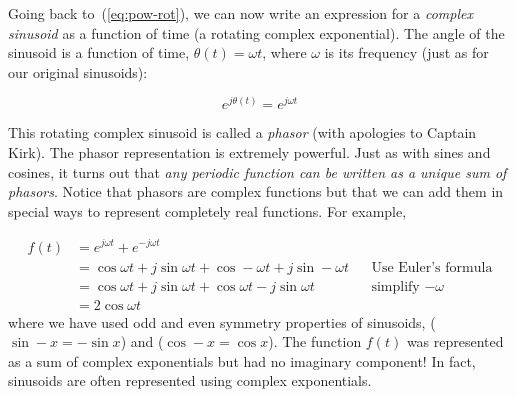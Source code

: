 
Going back to~(\ref{eq:pow-rot}), we can now write an expression for a
\emph{complex sinusoid} as a function of time (a rotating complex exponential). The angle
of the sinusoid is a function of time, $\theta(t) = \omega t$, where
$\omega$ is its frequency (just as for our original sinusoids):

\begin{equation}
e^{j\theta(t)} = e^{j\omega t} \label{eq:phasor-first}
\end{equation}

This rotating complex sinusoid is called a \emph{phasor} (with
apologies to Captain Kirk). The phasor representation is extremely powerful. Just as with sines and cosines, it turns out that \emph{any periodic function can be written as a unique sum of phasors}. Notice that phasors are complex functions but that we can add them in special ways to represent completely real functions. For example,

\begin{align*}
f(t) &= e^{j\omega t}+e^{-j\omega t} \\
&=\cos\omega t + j\sin\omega t +\cos-\omega t + j\sin-\omega t &&\text{Use Euler's formula} \\
&=\cos\omega t + j\sin\omega t +\cos\omega t - j\sin\omega t &&\text{simplify $-\omega$} \\
&= 2\cos\omega t
\end{align*}
where we have used odd and even symmetry properties of sinusoids, ($\sin-x=-\sin x$) and ($\cos-x=\cos x$). The function $f(t)$ was represented as a sum of complex exponentials but had no imaginary component! In fact, sinusoids are often represented using complex exponentials.

